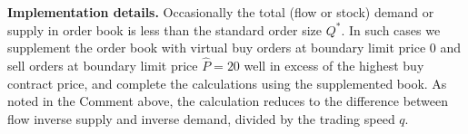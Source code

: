 \noindent
\textbf{Implementation details.} 
Occasionally the total (flow or stock) demand or supply in order book is less than the standard order size $Q^*.$
In such cases we supplement the order book with virtual buy orders at boundary limit price 0 and sell orders at boundary limit price $\hat{P} = 20$ well in excess of the highest buy contract price, and complete the calculations using the supplemented book. As noted in the Comment above, the calculation reduces to the difference between flow inverse supply and inverse demand, divided by the trading speed $q$. 






